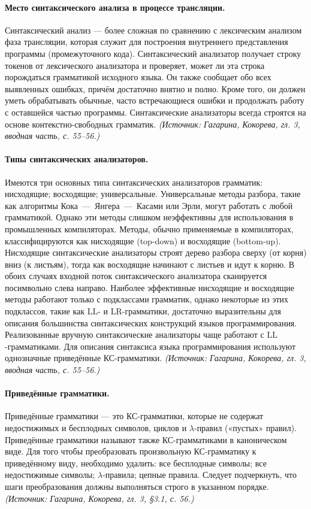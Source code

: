 \documentclass[a4paper,12pt]{article}
\begin{document}
\paragraph{Место синтаксического анализа в процессе трансляции.}
Синтаксический анализ — более сложная по сравнению с лексическим анализом фаза трансляции, которая служит для построения внутреннего представления программы (промежуточного кода). Синтаксический анализатор получает строку токенов от лексического анализатора и проверяет, может ли эта строка порождаться грамматикой исходного языка. Он также сообщает обо всех выявленных ошибках, причём достаточно внятно и полно. Кроме того, он должен уметь обрабатывать обычные, часто встречающиеся ошибки и продолжать работу с оставшейся частью программы. Синтаксические анализаторы всегда строятся на основе контекстно-свободных грамматик.
\textit{(Источник: Гагарина, Кокорева, гл. 3, вводная часть, с. 55--56.)}

\paragraph{Типы синтаксических анализаторов.}
Имеются три основных типа синтаксических анализаторов грамматик: нисходящие; восходящие; универсальные. Универсальные методы разбора, такие как алгоритмы Кока~—~Янгера~—~Касами или Эрли, могут работать с любой грамматикой. Однако эти методы слишком неэффективны для использования в промышленных компиляторах. Методы, обычно применяемые в компиляторах, классифицируются как нисходящие (top-down) и восходящие (bottom-up). Нисходящие синтаксические анализаторы строят дерево разбора сверху (от корня) вниз (к листьям), тогда как восходящие начинают с листьев и идут к корню. В обоих случаях входной поток синтаксического анализатора сканируется посимвольно слева направо. Наиболее эффективные нисходящие и восходящие методы работают только с подклассами грамматик, однако некоторые из этих подклассов, такие как \(\mathrm{LL}\)- и \(\mathrm{LR}\)-грамматики, достаточно выразительны для описания большинства синтаксических конструкций языков программирования. Реализованные вручную синтаксические анализаторы чаще работают с \(\mathrm{LL}\)-грамматиками. Для описания синтаксиса языка программирования используют однозначные приведённые КС-грамматики.
\textit{(Источник: Гагарина, Кокорева, гл. 3, вводная часть, с. 55--56.)}

\paragraph{Приведённые грамматики.}
Приведённые грамматики — это КС-грамматики, которые не содержат недостижимых и бесплодных символов, циклов и \(\lambda\)-правил («пустых» правил). Приведённые грамматики называют также КС-грамматиками в каноническом виде. Для того чтобы преобразовать произвольную КС-грамматику к приведённому виду, необходимо удалить: все бесплодные символы; все недостижимые символы; \(\lambda\)-правила; цепные правила. Следует подчеркнуть, что шаги преобразования должны выполняться строго в указанном порядке.
\textit{(Источник: Гагарина, Кокорева, гл. 3, §3.1, с. 56.)}
\end{document}
